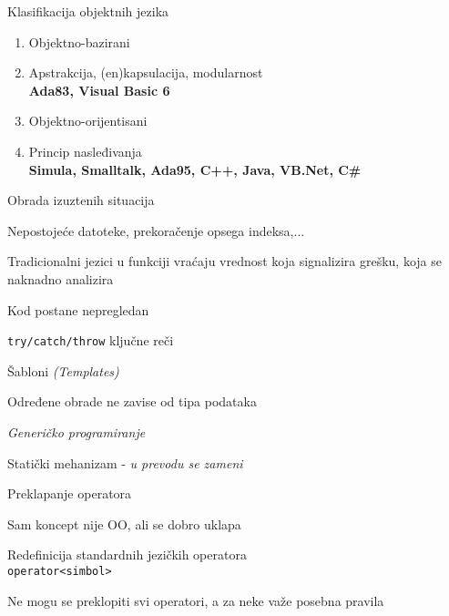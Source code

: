\documentclass{article}
\newenvironment{xitemize}{%
    
    \itemize
    \larger
}{%
    \enditemize
}
\let\olditemize\itemize
\let\endolditemize\enditemize
\renewenvironment{itemize}{%
    \smaller
    \olditemize
}{%
    \endolditemize
}
\providecommand{\inlinecode}[1]{\texttt{#1}}
\begin{document}
\begin{xitemize}
    \item Klasifikacija objektnih jezika
    \begin{enumerate}
        \item Objektno-bazirani
       \begin{itemize}
           \item Apstrakcija, (en)kapsulacija, modularnost\\ \textbf{Ada83, Visual Basic 6}
       \end{itemize} 
       \item Objektno-orijentisani
       \begin{itemize}
           \item Princip nasleđivanja\\
           \textbf{Simula, Smalltalk, Ada95, C++, Java, VB.Net, C\#}
       \end{itemize}
    \end{enumerate}
    \item Obrada izuztenih situacija
    \begin{itemize}
        \item Nepostojeće datoteke, prekoračenje opsega indeksa,...
        \item Tradicionalni jezici u funkciji vraćaju vrednost koja signalizira grešku, koja se naknadno analizira
        \item Kod postane nepregledan
        \item   \inlinecode{try/catch/throw} ključne reči
    \end{itemize}
    \item Šabloni \textit{(Templates)}
    \begin{itemize}
        \item Određene obrade ne zavise od tipa podataka
        \item \textit{Generičko programiranje}
        \item Statički mehanizam - \textit{u prevodu se zameni}
    \end{itemize}
    \item Preklapanje operatora
    \begin{itemize}
        \item Sam koncept nije OO, ali se dobro uklapa
        \item Redefinicija standardnih jezičkih operatora
        \\   \inlinecode{operator<simbol>}
        \item Ne mogu se preklopiti svi operatori, a za neke važe posebna pravila
    \end{itemize}
\end{xitemize}
\end{document}
